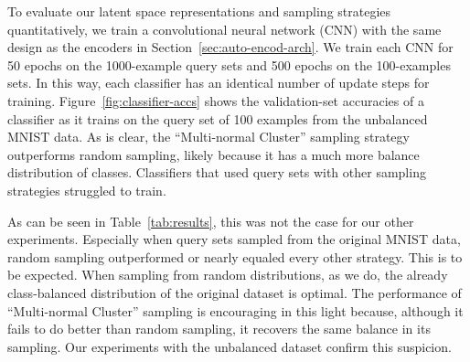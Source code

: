 \documentclass[a4paper]{article}
\begin{document}

To evaluate our latent space representations and sampling strategies
quantitatively, we train a convolutional neural network (CNN) with the same
design as the encoders in Section~\ref{sec:auto-encod-arch}. We train each CNN
for 50 epochs on the 1000-example query sets and 500 epochs on the 100-examples
sets. In this way, each classifier has an identical number of update steps for
training. Figure~\ref{fig:classifier-accs} shows the validation-set accuracies
of a classifier as it trains on the query set of 100 examples from the
unbalanced MNIST data. As is clear, the ``Multi-normal Cluster'' sampling
strategy outperforms random sampling, likely because it has a much more balance
distribution of classes. Classifiers that used query sets with other sampling
strategies struggled to train.

As can be seen in Table~\ref{tab:results}, this was not the case for our other
experiments. Especially when query sets sampled from the original MNIST data,
random sampling outperformed or nearly equaled every other strategy. This is to
be expected. When sampling from random distributions, as we do, the
already class-balanced distribution of the original dataset is optimal. The
performance of ``Multi-normal Cluster'' sampling is encouraging in this light
because, although it fails to do better than random sampling, it recovers the
same balance in its sampling. Our experiments with the unbalanced dataset
confirm this suspicion.
\end{document}
